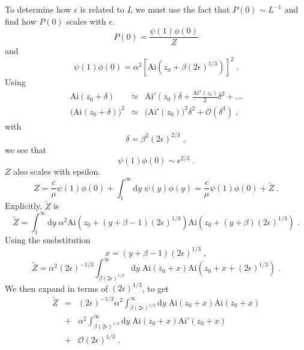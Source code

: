 \documentclass[a4paper,10pt]{article}
\newcommand{\pzero}{P(0)}
\newcommand{\D}{\mathrm{d}}
\newcommand{\Or}{\mathcal{O}}
\newcommand{\Ai}{\mathrm{Ai}}
\begin{document}
To determine how $\epsilon$ is related to $L$ we must use the fact that $\pzero \sim L^{-1}$ and find how $\pzero$ scales with $\epsilon$.
\begin{equation}
  \pzero = \frac{\psi(1)\phi(0)}{Z}
\end{equation}
and
\begin{equation}
  \psi(1)\phi(0) = \alpha^2 [ \Ai(z_0 + \beta(2\epsilon)^{1/3}) ]^2 \;.
\end{equation}
Using
\begin{eqnarray}
  \Ai(z_0 + \delta) & \simeq & \Ai'(z_0)\delta + \frac{\Ai''(z_0)}{2} \delta^2 + \ldots \nonumber \\
  \bigg( \Ai(z_0 + \delta) \bigg)^2 & \simeq & \bigg( \Ai'(z_0) \bigg)^2 \delta^2 + \Or(\delta^3) \;,
\end{eqnarray}
with
\begin{equation}
  \delta = \beta^2(2\epsilon)^{2/3} \;,
\end{equation}
we see that
\begin{equation}
  \psi(1)\phi(0) \sim \epsilon^{2/3} \;.
\end{equation}
$Z$ also scales with epsilon. 
\begin{equation}
 Z = \frac{c}{\mu}\psi(1)\phi(0)  + \int_{1}^\infty \D y \; \psi(y)\phi(y)  = \frac{c}{\mu}\psi(1)\phi(0) + \tilde{Z}\;.
\end{equation}
Explicitly, $\tilde{Z}$ is
\begin{equation}
 \tilde{Z} = \int_{1}^\infty \D y \; \alpha^2 \Ai( z_0 + (y+\beta-1)(2\epsilon)^{1/3}) \Ai ( z_0 + (y+\beta)(2\epsilon)^{1/3}) \;.
\end{equation}
Using the susbstitution
\begin{equation}
  x = (y+\beta-1)(2\epsilon)^{1/3} \;,
\end{equation}
\begin{equation}
 \tilde{Z} = \alpha^2 (2\epsilon)^{-1/3} \int_{\beta(2\epsilon)^{1/3}}^\infty \D y \;  \Ai( z_0 + x) \Ai ( z_0 + x + (2\epsilon)^{1/3}) \;.
\end{equation}
We then expand in terms of $(2\epsilon)^{1/3}$, to get 
\begin{eqnarray}
 \tilde{Z}  & = & (2\epsilon)^{-1/3} \alpha^2  \int_{\beta(2\epsilon)^{1/3}}^\infty \D y \;  \Ai( z_0 + x) \Ai ( z_0 + x)  \nonumber \\
            & + & \alpha^2  \int_{\beta(2\epsilon)^{1/3}}^\infty \D y \;  \Ai( z_0 + x) \Ai' ( z_0 + x )  \nonumber \\
            & + & \Or(2\epsilon)^{1/3}\;.
\end{eqnarray}
\end{document}
